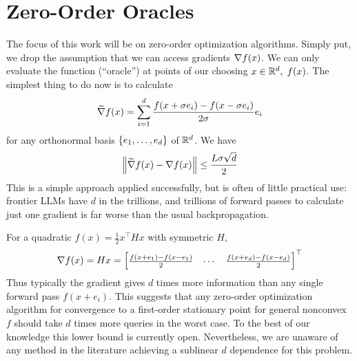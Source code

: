 \section{Zero-Order Oracles}
The focus of this work will be on zero-order optimization algorithms. Simply put, we drop the assumption that we can access gradients $\nabla f(x)$. We can only evaluate the function (``oracle'') at points of our choosing $x \in \mathbb{R}^d, \; f(x)$. The simplest thing to do now is to calculate
\begin{align*}
    \widetilde{\nabla} f(x) = \sum_{i=1}^d \frac{f(x+\sigma e_i) - f(x-\sigma e_i)}{2 \sigma} e_i 
\end{align*}
for any orthonormal basis $\left\{e_1, \ldots, e_d\right\}$ of $\mathbb{R}^d$. We have
\begin{align*}
    \left\lVert \widetilde{\nabla} f(x) - \nabla f(x) \right\rVert \leq \frac{L\sigma \sqrt{d}}{2}
\end{align*}
This is a simple approach applied successfully, but is often of little practical use: frontier LLMs have $d$ in the trillions, and trillions of forward passes to calculate just one gradient is far worse than the usual backpropagation. 

For a quadratic $f(x) = \frac 12 x^\top H x$ with symmetric $H$, 
\begin{align*}
    \nabla f(x) = Hx = \begin{bmatrix}
        \frac{f(x+e_1) - f(x-e_1)}{2} & \cdots & \frac{f(x+e_d) - f(x-e_d)}{2}
    \end{bmatrix}^\top
\end{align*}
Thus typically the gradient gives $d$ times more information than any single forward pass $f(x+e_i)$. This suggests that any zero-order optimization algorithm for convergence to a first-order stationary point for general nonconvex $f$ should take $d$ times more queries in the worst case. To the best of our knowledge this lower bound is currently open. Nevertheless, we are unaware of any method in the literature achieving a sublinear $d$ dependence for this problem.

